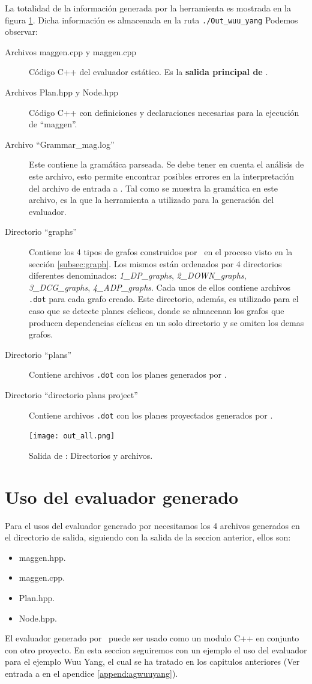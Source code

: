 La totalidad de la información generada por la herramienta es mostrada en la figura \ref{fig:outmagegn}. Dicha información es almacenada en la ruta \texttt{./Out\_wuu\_yang}  Podemos observar:
\begin{description}
\item [Archivos maggen.cpp y maggen.cpp] Código C++ del evaluador estático. Es la \textbf{salida principal de} \maggen.
\item [Archivos Plan.hpp y Node.hpp] Código C++ con definiciones y declaraciones necesarias para la ejecución de ``maggen''.
\item [Archivo ``Grammar\_mag.log''] Este contiene la gramática parseada. Se debe tener en cuenta el análisis de este archivo, esto permite encontrar posibles errores en la interpretación del archivo de entrada a \maggen. Tal como se muestra la gramática en este archivo, es la que la herramienta a utilizado para la generación del evaluador.
\item [Directorio ``graphs''] Contiene los 4 tipos de grafos construidos por \maggen\ en el proceso visto en la sección \ref{subsec:graph}. Los mismos están ordenados por 4 directorios diferentes denominados: \textit{1\_DP\_graphs}, \textit{2\_DOWN\_graphs}, \textit{3\_DCG\_graphs}, \textit{4\_ADP\_graphs}. Cada unos de ellos contiene archivos \texttt{.dot} para cada grafo creado. Este directorio, además, es utilizado para el caso que se detecte planes cíclicos, donde se almacenan los grafos que producen dependencias cíclicas en un solo directorio y se omiten los demas grafos.
\item [Directorio ``plans''] Contiene archivos \texttt{.dot} con los planes generados por \maggen.
\item [Directorio ``directorio plans project''] Contiene archivos \texttt{.dot} con los planes proyectados generados por \maggen.
\end{description}

\begin{figure}\centering
\texttt{[image: out\_all.png]}
\caption{\label{fig:outmagegn} Salida de \maggen: Directorios y archivos.}
\end{figure}


\section{Uso del evaluador generado}
Para el usos del evaluador generado por \maggen necesitamos los 4 archivos generados en el directorio de salida, siguiendo con la salida de la seccion anterior, ellos son:
\begin{itemize}
\item maggen.hpp.
\item maggen.cpp.
\item Plan.hpp.
\item Node.hpp.
\end{itemize}
El evaluador generado por \maggen\ puede ser usado como un modulo C++ en conjunto con otro proyecto. En esta seccion seguiremos con un ejemplo el uso del evaluador para el ejemplo Wuu Yang, el cual se ha tratado en los capitulos anteriores (Ver entrada a \maggen en el apendice \ref{append:agwuuyang}).

